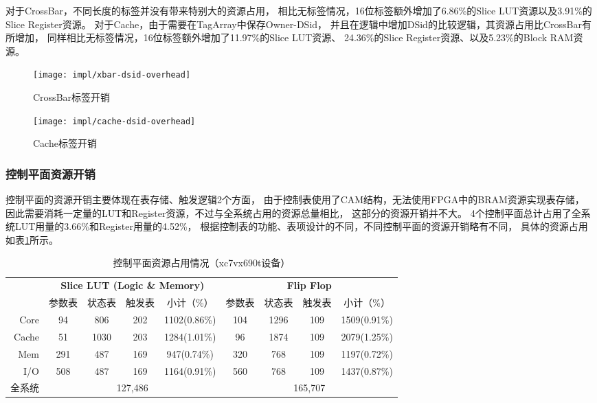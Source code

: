 对于CrossBar，不同长度的标签并没有带来特别大的资源占用，
相比无标签情况，16位标签额外增加了6.86\%的Slice LUT资源以及3.91\%的Slice Register资源。
对于Cache，由于需要在TagArray中保存Owner-DSid，
并且在逻辑中增加DSid的比较逻辑，其资源占用比CrossBar有所增加，
同样相比无标签情况，16位标签额外增加了11.97\%的Slice LUT资源、
24.36\%的Slice Register资源、以及5.23\%的Block RAM资源。

\begin{figure}[b]
\begin{minipage}{0.48\textwidth}
  \centering
  \texttt{[image: impl/xbar-dsid-overhead]}
  \caption{CrossBar标签开销}
  \label{fig:xbar-dsid-overhead}
\end{minipage}\hfill
\begin{minipage}{0.48\textwidth}
  \centering
  \texttt{[image: impl/cache-dsid-overhead]}
  \caption{Cache标签开销}
  \label{fig:cache-dsid-overhead}
\end{minipage}
\end{figure}


\subsubsection{控制平面资源开销}

控制平面的资源开销主要体现在表存储、触发逻辑2个方面，
由于控制表使用了CAM结构，无法使用FPGA中的BRAM资源实现表存储，
因此需要消耗一定量的LUT和Register资源，不过与全系统占用的资源总量相比，
这部分的资源开销并不大。
4个控制平面总计占用了全系统LUT用量的3.66\%和Register用量的4.52\%，
根据控制表的功能、表项设计的不同，不同控制平面的资源开销略有不同，
具体的资源占用如表\ref{tab:pard-cp-resource}所示。

\begin{table}[htb]
  \centering
  \caption{控制平面资源占用情况（xc7vx690t设备）}
  \label{tab:pard-cp-resource}
  \begin{tabular*}{\linewidth}{rcccccccc}
    \toprule[1.5pt]
          & \multicolumn{4}{c}{\textbf{Slice LUT (Logic \& Memory)}}  & \multicolumn{4}{c}{\textbf{Flip Flop}} \\
          & 参数表 & 状态表 & 触发表 & 小计（\%）   & 参数表 & 状态表 & 触发表 & 小计（\%）       \\
    \midrule[1pt]
     Core &     94 &    806 &    202 & 1102(0.86\%) &    104 &   1296 &    109 & 1509(0.91\%)      \\
    Cache &     51 &   1030 &    203 & 1284(1.01\%) &     96 &   1874 &    109 & 2079(1.25\%)      \\
      Mem &    291 &    487 &    169 &  947(0.74\%) &    320 &    768 &    109 & 1197(0.72\%)      \\
      I/O &    508 &    487 &    169 & 1164(0.91\%) &    560 &    768 &    109 & 1437(0.87\%)      \\
    \hline
   全系统 & \multicolumn{4}{c}{127,486}             & \multicolumn{4}{c}{165,707}                  \\
    \bottomrule[1.5pt]
  \end{tabular*}\\[2pt]
\end{table}


